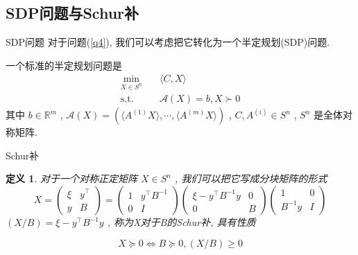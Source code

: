 \documentclass[slidestop, compress, mathserif, UTF8]{beamer}
\newtheorem{define}{\bf \textcolor[rgb]{0.8,0,0}{定义}}[section]
\numberwithin{equation}{section}                                        %
\begin{document}
		\subsection{SDP问题与Schur补}
			\begin{frame}[t]{SDP问题}
				对于问题(\ref{q4}), 我们可以考虑把它转化为一个半定规划(SDP)问题.

				一个标准的半定规划问题是
				\begin{equation}
					\begin{split}\label{SDP}
						\min_{X \in S^n} \quad
							& \langle{C, X}\rangle\\
						\text{s.t.} \quad
							& \mathcal{A}(X) = b, X \succ 0
					\end{split}
				\end{equation}
				\small{其中 $b \in \mathbb{R}^{m}$ , $\mathcal{A}(X) = (\langle{A^{(1)} X}\rangle, \cdots, \langle{A^{(m)} X}\rangle)$ , $C, A^{(i)}\in S^n$ , $S^n$ 是全体对称矩阵.}\normalsize
			\end{frame}
			\begin{frame}[t]{Schur补}
				\begin{define}
					对于一个对称正定矩阵 $X \in S^n$ , 我们可以把它写成分块矩阵的形式
					\begin{equation}
							X
						=	\begin{pmatrix}
								\xi & y^\top \\
								y & B
							\end{pmatrix}
						=	\begin{pmatrix}
								1 & y^\top B^{-1} \\
								0 & I
							\end{pmatrix}
							\begin{pmatrix}
								\xi - y^\top B^{-1} y & 0 \\
								0 & B
							\end{pmatrix}
							\begin{pmatrix}
								1 & 0 \\
								B^{-1} y & I
							\end{pmatrix}
					\end{equation}
					$(X/B) = \xi - y^\top B^{-1} y$ , 称为X对于B的Schur补, 具有性质

					\begin{equation}\label{SchurCondition}
						X \succeq 0 \Leftrightarrow B \succeq 0, (X/B) \geq 0
					\end{equation}
				\end{define}
			\end{frame}
\end{document}
